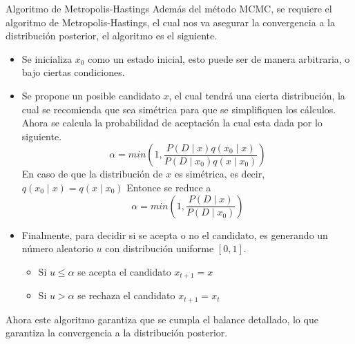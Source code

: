 \documentclass[10pt]{beamer}
\begin{document}
\begin{frame}{Algoritmo de Metropolis-Hastings}
Además del método MCMC, se requiere el algoritmo de Metropolis-Hastings, el cual nos va asegurar la convergencia a la distribución posterior, el algoritmo es el siguiente.

\begin{itemize}
\item Se inicializa $x_0$ como un estado inicial, esto puede ser de manera arbitraria, o bajo ciertas condiciones.
\item Se propone un posible candidato $x$, el cual tendrá una cierta distribución, la cual se recomienda que sea simétrica para que se simplifiquen los cálculos. Ahora se calcula la probabilidad de aceptación la cual esta dada por lo siguiente.
\begin{equation}
\alpha = min\left(1,\frac{P(D\mid x)q(x_0\mid x)}{P(D\mid x_0)q(x\mid x_0)}\right)
\end{equation}
En caso de que la distribución de $x$ es simétrica, es decir, $q(x_0\mid x)=q(x\mid x_0)$
Entonce se reduce a 
\begin{equation}
\alpha = min\left(1,\frac{P(D\mid x)}{P(D\mid x_0)}\right)
\end{equation}
\end{itemize}

\end{frame}

\begin{frame}
\begin{itemize}
\item Finalmente, para decidir si se acepta o no el candidato, es generando un número aleatorio $u$ con distribución uniforme $[0,1]$.

\begin{itemize}
\item Si $u\leq \alpha$ se acepta el candidato $x_{t+1} = x$
\item Si $u>\alpha$ se rechaza el candidato $x_{t+1}=x_t$
\end{itemize}

\end{itemize}

Ahora este algoritmo garantiza que se cumpla el balance detallado, lo que garantiza la convergencia a la distribución posterior.
\end{frame}
\end{document}
